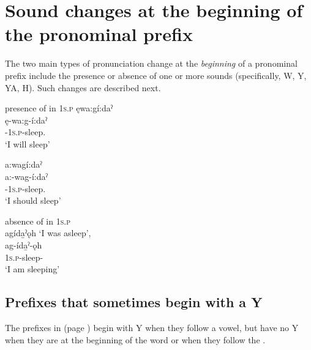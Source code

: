 \section{Sound changes at the beginning of the pronominal prefix} \label{Sound changes at the beginning of the pronominal prefix}
The two main types of pronunciation change at the \emph{beginning} of a pronominal prefix include the presence  or absence  of one or more sounds (specifically, W, Y, YA, H). Such changes are described next.
 
\ea\label{ex:pronominalprefixpronunex2} presence of  in  \textsc{1s.p}
\ea ęwa:gí:daˀ\\
\gll ę-wa:g-í:daˀ\\
 \fut-\textsc{1s.p}-sleep.{\punctual}\\
\glt `I will sleep'


\ex a:wagí:daˀ\\
\gll a:-wag-í:daˀ\\
 {\indefinite}-\textsc{1s.p}-sleep.{\punctual}\\
\glt `I should sleep'
\z
\z

\newpage
\ea\label{ex:pronominalprefixpronunex3} absence of  in  \textsc{1s.p}\\
agída̱ˀǫh ‘I was asleep’,\\
\gll ag-ída̱ˀ-ǫh\\
 \textsc{1s.p}-sleep-{\stative}\\
\glt `I am sleeping'
\z


\subsection{Prefixes that sometimes begin with a Y} \label{Prefixes that sometimes begin with a Y}
The prefixes in  (page \pageref{figtab:1:yinit}) begin with Y when they follow a vowel, but have no Y when they are at the beginning of the word or when they follow the  \textsc{\factual}.

